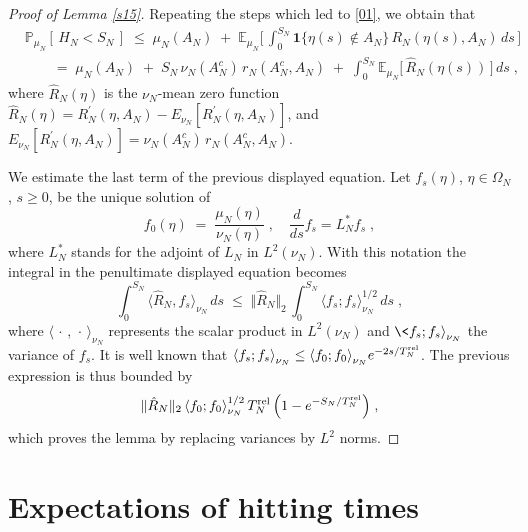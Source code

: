 \documentclass[reqno]{amsart}
\begin{document}
\begin{proof}[Proof of Lemma \ref{s15}]
Repeating the steps which led to \eqref{01}, we
obtain that
\begin{equation*}
\begin{split}
& {{\mathbb P}}_{\mu_N} [\, H_N < S_N \,] \;\le\; \mu_N(A_N) \;+\;
{{\mathbb E}}_{\mu_N} \Big[\, \int_0^{S_N} {{\mathbf 1}}\{\eta(s) \not\in A_N\} \,
R_N(\eta(s), A_N) \, ds \, \Big ]
\\
&\qquad =\;
\mu_N(A_N) \;+\; S_N\, \nu_N (A_N^c)\, r_N(A_N^c, A_N) \;+\;
\int_0^{S_N} {{\mathbb E}}_{\mu_N} \Big[\,\hat R_N(\eta(s)) \, \Big ] \, ds
\; ,
\end{split}
\end{equation*}
where $\hat R_N(\eta)$ is the $\nu_N$-mean zero function $\hat
R_N(\eta) = R^\prime_N(\eta, A_N) - E_{\nu_N}[R^\prime_N(\eta, A_N)]$,
and $E_{\nu_N}[R^\prime_N(\eta, A_N)] = \nu_N (A_N^c)\, r_N(A_N^c,
A_N)$.

We estimate the last term of the previous displayed equation.  Let
$f_s (\eta)$, $\eta\in\Omega_N$, $s\ge 0$, be the unique solution of
\begin{equation*}
f_0(\eta)\;=\; \frac{\mu_N(\eta)}{\nu_N(\eta)}\;, \quad \frac d{ds}
f_s = L^*_N f_s\;,
\end{equation*}
where $L^*_N$ stands for the adjoint of $L_N$ in $L^2(\nu_N)$. With
this notation the integral in the penultimate displayed equation
becomes
\begin{equation*}
\int_0^{S_N} {\langle}\hat R_N , f_s {\rangle}_{\nu_N} \, ds \;\le\; 
\Vert \hat R_N \Vert_2 \,
\int_0^{S_N} {\langle} f_s ; f_s {\rangle}_{\nu_N}^{1/2} \, ds \;,
\end{equation*}
where ${\langle}\,\cdot\,,\,\cdot\, {\rangle}_{\nu_N}$ represents the scalar product
in $L^2(\nu_N)$ and $\<f_s; f_s {\rangle}_{\nu_N}$ the variance of $f_s$. It
is well known that ${\langle} f_s ; f_s {\rangle}_{\nu_N} \le {\langle} f_0 ; f_0
{\rangle}_{\nu_N} e^{-2s/T^{\rm rel}_N}$. The previous expression is thus
bounded by
\begin{equation*}
\Vert \hat R_N \Vert_2 \, {\langle} f_0 ; f_0 {\rangle}_{\nu_N}^{1/2} 
\, T^{\rm rel}_N\, \Big( 1 - e^{-S_N/T^{\rm rel}_N} \Big)\;,
\end{equation*}
which proves the lemma by replacing variances by $L^2$ norms.
\end{proof}

\section{Expectations of hitting times}
\label{sec3}
\end{document}
